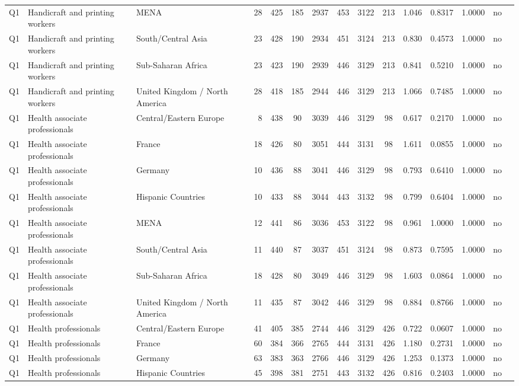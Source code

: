 \begin{longtable}{lllrcccccccccll}
Q1 & Handicraft and printing workers & MENA & 28 & 425 & 185 & 2937 & 453 & 3122 & 213 & 1.046 & 0.8317 & 1.0000 & no \\
Q1 & Handicraft and printing workers & South/Central Asia & 23 & 428 & 190 & 2934 & 451 & 3124 & 213 & 0.830 & 0.4573 & 1.0000 & no \\
Q1 & Handicraft and printing workers & Sub-Saharan Africa & 23 & 423 & 190 & 2939 & 446 & 3129 & 213 & 0.841 & 0.5210 & 1.0000 & no \\
Q1 & Handicraft and printing workers & United Kingdom / North America & 28 & 418 & 185 & 2944 & 446 & 3129 & 213 & 1.066 & 0.7485 & 1.0000 & no \\
Q1 & Health associate professionals & Central/Eastern Europe & 8 & 438 & 90 & 3039 & 446 & 3129 & 98 & 0.617 & 0.2170 & 1.0000 & no \\
Q1 & Health associate professionals & France & 18 & 426 & 80 & 3051 & 444 & 3131 & 98 & 1.611 & 0.0855 & 1.0000 & no \\
Q1 & Health associate professionals & Germany & 10 & 436 & 88 & 3041 & 446 & 3129 & 98 & 0.793 & 0.6410 & 1.0000 & no \\
Q1 & Health associate professionals & Hispanic Countries & 10 & 433 & 88 & 3044 & 443 & 3132 & 98 & 0.799 & 0.6404 & 1.0000 & no \\
Q1 & Health associate professionals & MENA & 12 & 441 & 86 & 3036 & 453 & 3122 & 98 & 0.961 & 1.0000 & 1.0000 & no \\
Q1 & Health associate professionals & South/Central Asia & 11 & 440 & 87 & 3037 & 451 & 3124 & 98 & 0.873 & 0.7595 & 1.0000 & no \\
Q1 & Health associate professionals & Sub-Saharan Africa & 18 & 428 & 80 & 3049 & 446 & 3129 & 98 & 1.603 & 0.0864 & 1.0000 & no \\
Q1 & Health associate professionals & United Kingdom / North America & 11 & 435 & 87 & 3042 & 446 & 3129 & 98 & 0.884 & 0.8766 & 1.0000 & no \\
Q1 & Health professionals & Central/Eastern Europe & 41 & 405 & 385 & 2744 & 446 & 3129 & 426 & 0.722 & 0.0607 & 1.0000 & no \\
Q1 & Health professionals & France & 60 & 384 & 366 & 2765 & 444 & 3131 & 426 & 1.180 & 0.2731 & 1.0000 & no \\
Q1 & Health professionals & Germany & 63 & 383 & 363 & 2766 & 446 & 3129 & 426 & 1.253 & 0.1373 & 1.0000 & no \\
Q1 & Health professionals & Hispanic Countries & 45 & 398 & 381 & 2751 & 443 & 3132 & 426 & 0.816 & 0.2403 & 1.0000 & no \\

\end{longtable}
